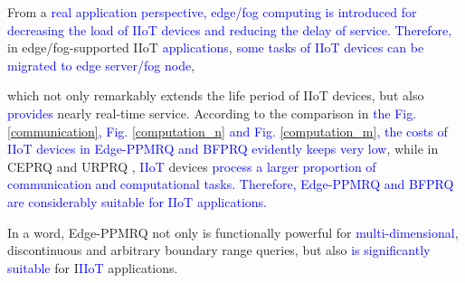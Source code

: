 \documentclass[IEEE JOURNAL OF BIOMEDICAL AND HEALTH INFORMATICS]{IEEEtran}
\begin{document}
{From a \textcolor{blue}{real application perspective, edge/fog computing is introduced for decreasing the load of \textcolor{blue}{IIoT} devices and reducing the delay of service. Therefore,}
in edge/fog-supported IIoT \textcolor{blue}{applications}, \textcolor{blue}{some tasks of IIoT devices can be migrated to edge server/fog node}, 

 which not only remarkably extends the life period of IIoT devices, but also \textcolor{blue}{provides} nearly real-time service. According to the comparison in \textcolor{blue}{the Fig. \ref{communication}, Fig. \ref{computation_n} and Fig. \ref{computation_m}, the costs of \textcolor{blue}{IIoT} devices in Edge-PPMRQ and BFPRQ \cite{mahdikhani2020IoT}} \textcolor{blue}{evidently keeps very low}, while in CEPRQ \cite{hasan2020IoT} and URPRQ \cite{mahdikhani2020using}, \textcolor{blue}{IIoT} devices \textcolor{blue}{process a larger proportion of communication and computational tasks. Therefore, Edge-PPMRQ and BFPRQ \cite{mahdikhani2020IoT} are considerably suitable for IIoT applications.}

In a word, Edge-PPMRQ not only is functionally powerful for \textcolor{blue}{multi-dimensional}, discontinuous and arbitrary boundary range queries, but also \textcolor{blue}{is significantly suitable} for I\textcolor{blue}{IIoT} applications.

}
\end{document}
